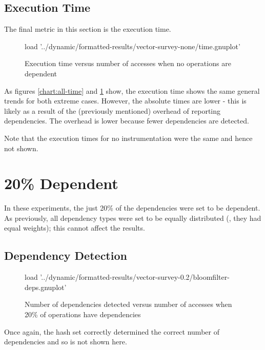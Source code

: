 	\subsection{Execution Time} \label{sec:results/none/time}
	The final metric in this section is the execution time.
	
	\begin{figure}
		\centering
		\begin{gnuplot}[terminal=pdf]
			load '../dynamic/formatted-results/vector-survey-none/time.gnuplot'
		\end{gnuplot}
		\caption{Execution time versus number of accesses when no operations are dependent}
		\label{chart:none-time}
	\end{figure}
	
	As figures \ref{chart:all-time} and \ref{chart:none-time} show, the execution time shows the same general trends for both extreme cases. However, the absolute times are lower - this is likely as a result of the (previously mentioned) overhead of reporting dependencies. The overhead is lower because fewer dependencies are detected.
	
	Note that the execution times for no instrumentation were the same and hence not shown.
	
\section{20\% Dependent} \label{sec:results/20}
	In these experiments, the just 20\% of the dependencies were set to be dependent. As previously, all dependency types were set to be equally distributed (\ie, they had equal weights); this cannot affect the results.

	\subsection{Dependency Detection} \label{sec:results/20/deps}
	\begin{figure}
		\centering
		\begin{gnuplot}[terminal=pdf]
			load '../dynamic/formatted-results/vector-survey-0.2/bloomfilter-deps.gnuplot'
		\end{gnuplot}
		\caption{Number of dependencies detected versus number of accesses when 20\% of operations have dependencies}
		\label{chart:20-dep}
	\end{figure}
	
	Once again, the hash set correctly determined the correct number of dependencies and so is not shown here.
	
